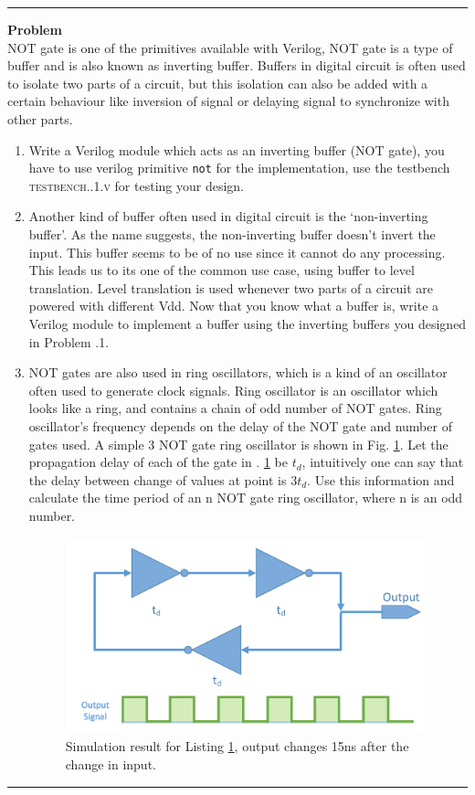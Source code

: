 \documentclass[a4paper,10pt]{article}
\newcommand{\ano}{\text{2}}
\theoremstyle{mytheor}
\newcommand{
  \insertverilog}[3]{
  
}
\newcounter{problemNumber}
\newcommand {
  \insertProblem}[1]{
  \vspace{0.5cm}
  \hrule
  \vspace{0.3cm}

  {\color{greatblue}\textbf{\large{Problem \theproblemNumber}}}
  \vspace{2pt}\\#1

  \addtocounter{problemNumber}{1}
  \vspace{0.2cm}
  \hrule  
  \vspace{0.5cm}
}
\begin{document}
\insertverilog{./verilog_files/delayExample.v}{delay-example}{\text{Example usage of delays statement to specify propagation delay of logic gates.}}
\pagebreak
\insertProblem { NOT gate is one of the primitives available with
  Verilog, NOT gate is a type of buffer and is also known as inverting
  buffer. Buffers in digital circuit is often used to isolate two
  parts of a circuit, but this isolation can also be added with a
  certain behaviour like inversion of signal or delaying signal to
  synchronize with other parts.
  
  \begin {enumerate}
  \item Write a Verilog module which acts as an inverting buffer (NOT
    gate), you have to use verilog primitive
    \lstinline[style=verilog_inline_style]{not} for the
    implementation, use the testbench
    \textsc{testbench{\ano}.{\theproblemNumber}.1.v} for testing your
    design.
  \item Another kind of buffer often used in digital circuit is the
    `non-inverting buffer'. As the name suggests, the non-inverting
    buffer doesn't invert the input. This buffer seems to be of no use
    since it cannot do any processing. This leads us to its one of the
    common use case, using buffer to level translation. Level
    translation is used whenever two parts of a circuit are powered
    with different Vdd. Now that you know what a buffer is, write a
    Verilog module to implement a buffer using the inverting buffers
    you designed in Problem {\theproblemNumber}.1.
  \item NOT gates are also used in ring oscillators, which is a kind
    of an oscillator often used to generate clock signals. Ring
    oscillator is an oscillator which looks like a ring, and contains
    a chain of odd number of NOT gates. Ring oscillator's frequency
    depends on the delay of the NOT gate and number of gates used. A
    simple 3 NOT gate ring oscillator is shown in
    Fig. \ref{ring-oscillator}. Let the propagation delay of each of
    the gate in \Fig. \ref{ring-oscillator} be $t_d$, intuitively one
    can say that the delay between change of values at point is
    $3t_d$. Use this information and calculate the time period of an n
    NOT gate ring oscillator, where n is an odd number.

    \begin{figure}[!h] \centering  
      \includegraphics[width=0.5\linewidth]{./resources/ringOscillator.pdf}
      \caption{Simulation result for Listing \ref{ring-oscillator}, output changes 15ns after the change in input.} 
      \label{ring-oscillator}
    \end{figure}


\end{enumerate}}
\end{document}
